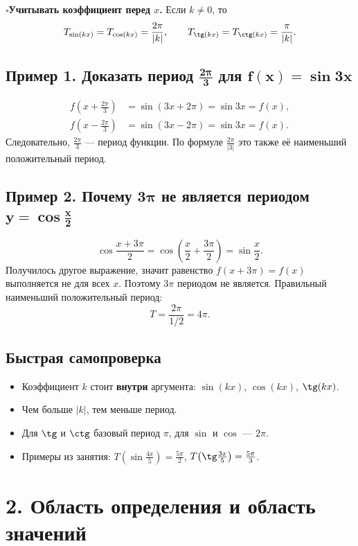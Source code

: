 \documentclass[a4paper,12pt]{article}
\newcommand{\checkitem}{\(\square\)\hspace{0.45em}}
\newcommand{\sectionrule}{\par\vspace{-0.3em}{\color{accent}\rule{\linewidth}{0.7pt}}\vspace{0.6em}}
\newcommand{\key}[1]{\textbf{\color{darkaccent}#1}}
\begin{document}
\checkitem \key{Учитывать коэффициент перед $x$.} Если $k\ne0$, то
\[
T_{\sin(kx)}=T_{\cos(kx)}=\frac{2\pi}{|k|},
\qquad
T_{\tg(kx)}=T_{\ctg(kx)}=\frac{\pi}{|k|}.
\]

\subsection*{Пример 1. Доказать период $\boldsymbol{\frac{2\pi}{3}}$ для $\boldsymbol{f(x)=\sin 3x}$}
\[
\begin{aligned}
f\!\left(x+\frac{2\pi}{3}\right)
&=\sin\!\left(3x+2\pi\right)=\sin 3x=f(x),\\
f\!\left(x-\frac{2\pi}{3}\right)
&=\sin\!\left(3x-2\pi\right)=\sin 3x=f(x).
\end{aligned}
\]
Следовательно, $\frac{2\pi}{3}$ --- период функции. По формуле $\frac{2\pi}{|3|}$ это также её наименьший положительный период.

\subsection*{Пример 2. Почему $\boldsymbol{3\pi}$ не является периодом $\boldsymbol{y=\cos\frac{x}{2}}$}
\[
\cos\frac{x+3\pi}{2}
=\cos\left(\frac{x}{2}+\frac{3\pi}{2}\right)
=\sin\frac{x}{2}.
\]
Получилось другое выражение, значит равенство $f(x+3\pi)=f(x)$ выполняется не для всех $x$. Поэтому $3\pi$ периодом не является. Правильный наименьший положительный период:
\[
T=\frac{2\pi}{1/2}=4\pi.
\]

\subsection*{Быстрая самопроверка}
\begin{itemize}
\item Коэффициент $k$ стоит \textbf{внутри} аргумента: $\sin(kx)$, $\cos(kx)$, $\tg(kx)$.
\item Чем больше $|k|$, тем меньше период.
\item Для $\tg$ и $\ctg$ базовый период $\pi$, для $\sin$ и $\cos$ --- $2\pi$.
\item Примеры из занятия: $T\!\left(\sin\frac{4x}{5}\right)=\frac{5\pi}{2}$, \quad $T\!\left(\tg\frac{3x}{5}\right)=\frac{5\pi}{3}$.
\end{itemize}

\section*{2. Область определения и область значений}
\sectionrule
\end{document}
